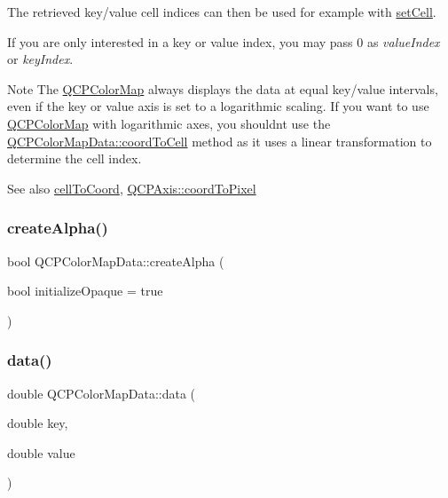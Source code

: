 The retrieved key/value cell indices can then be used for example with \mbox{\hyperlink{class_q_c_p_color_map_data_a8e75eaf8746596319032a93f3d2d0683}{set\+Cell}}.

If you are only interested in a key or value index, you may pass 0 as {\itshape value\+Index} or {\itshape key\+Index}.

\begin{DoxyNote}{Note}
The \mbox{\hyperlink{class_q_c_p_color_map}{Q\+C\+P\+Color\+Map}} always displays the data at equal key/value intervals, even if the key or value axis is set to a logarithmic scaling. If you want to use \mbox{\hyperlink{class_q_c_p_color_map}{Q\+C\+P\+Color\+Map}} with logarithmic axes, you shouldn\textquotesingle{}t use the \mbox{\hyperlink{class_q_c_p_color_map_data_aca5b29e0ca2f299c9060fc6e1f74d0c8}{Q\+C\+P\+Color\+Map\+Data\+::coord\+To\+Cell}} method as it uses a linear transformation to determine the cell index.
\end{DoxyNote}
\begin{DoxySeeAlso}{See also}
\mbox{\hyperlink{class_q_c_p_color_map_data_af1a36385c78ab624cd617065602408b6}{cell\+To\+Coord}}, \mbox{\hyperlink{class_q_c_p_axis_af15d1b3a7f7e9b53d759d3ccff1fe4b4}{Q\+C\+P\+Axis\+::coord\+To\+Pixel}} 
\end{DoxySeeAlso}
\mbox{\label{class_q_c_p_color_map_data_a42c2b1c303683515fa4de4c551f54441}} 
\subsubsection{\texorpdfstring{createAlpha()}{createAlpha()}}
{\footnotesize\ttfamily bool Q\+C\+P\+Color\+Map\+Data\+::create\+Alpha (\begin{DoxyParamCaption}\item[{bool}]{initialize\+Opaque = {\ttfamily true} }\end{DoxyParamCaption})\hspace{0.3cm}{\ttfamily [protected]}}

\mbox{\label{class_q_c_p_color_map_data_a2c33807b008cdb9e1394245c294c0eaf}} 
\subsubsection{\texorpdfstring{data()}{data()}}
{\footnotesize\ttfamily double Q\+C\+P\+Color\+Map\+Data\+::data (\begin{DoxyParamCaption}\item[{double}]{key,  }\item[{double}]{value }\end{DoxyParamCaption})}

